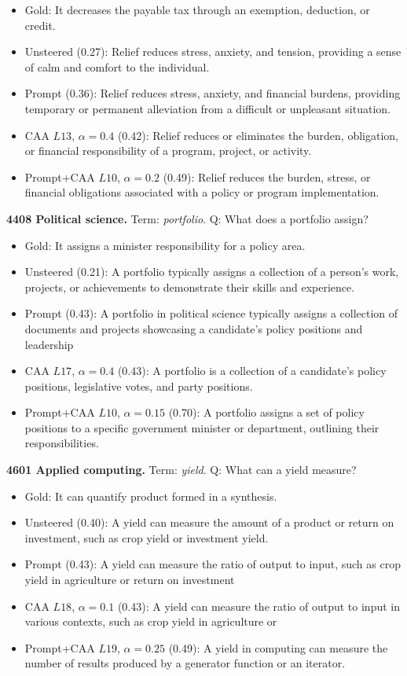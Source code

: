 \begin{itemize}\setlength{\itemsep}{0.15em}\setlength{\parsep}{0pt}\setlength{\topsep}{0.2em}
\item Gold: It decreases the payable tax through an exemption, deduction, or credit.
\item Unsteered (0.27): Relief reduces stress, anxiety, and tension, providing a sense of calm and comfort to the individual.
\item Prompt (0.36): Relief reduces stress, anxiety, and financial burdens, providing temporary or permanent alleviation from a difficult or unpleasant situation.
\item CAA $L13$, $\alpha=0.4$ (0.42): Relief reduces or eliminates the burden, obligation, or financial responsibility of a program, project, or activity.
\item Prompt+CAA $L10$, $\alpha=0.2$ (0.49): Relief reduces the burden, stress, or financial obligations associated with a policy or program implementation.
\end{itemize}
\medskip\noindent\textbf{4408 Political science.} Term: \emph{portfolio}.
Q: What does a portfolio assign?
\begin{itemize}\setlength{\itemsep}{0.15em}\setlength{\parsep}{0pt}\setlength{\topsep}{0.2em}
\item Gold: It assigns a minister responsibility for a policy area.
\item Unsteered (0.21): A portfolio typically assigns a collection of a person's work, projects, or achievements to demonstrate their skills and experience.
\item Prompt (0.43): A portfolio in political science typically assigns a collection of documents and projects showcasing a candidate's policy positions and leadership
\item CAA $L17$, $\alpha=0.4$ (0.43): A portfolio is a collection of a candidate's policy positions, legislative votes, and party positions.
\item Prompt+CAA $L10$, $\alpha=0.15$ (0.70): A portfolio assigns a set of policy positions to a specific government minister or department, outlining their responsibilities.
\end{itemize}
\medskip\noindent\textbf{4601 Applied computing.} Term: \emph{yield}.
Q: What can a yield measure?
\begin{itemize}\setlength{\itemsep}{0.15em}\setlength{\parsep}{0pt}\setlength{\topsep}{0.2em}
\item Gold: It can quantify product formed in a synthesis.
\item Unsteered (0.40): A yield can measure the amount of a product or return on investment, such as crop yield or investment yield.
\item Prompt (0.43): A yield can measure the ratio of output to input, such as crop yield in agriculture or return on investment
\item CAA $L18$, $\alpha=0.1$ (0.43): A yield can measure the ratio of output to input in various contexts, such as crop yield in agriculture or
\item Prompt+CAA $L19$, $\alpha=0.25$ (0.49): A yield in computing can measure the number of results produced by a generator function or an iterator.
\end{itemize}
